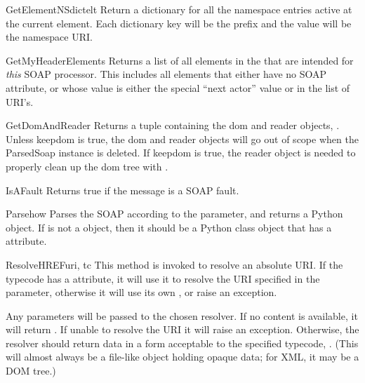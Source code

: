 \begin{methoddesc}{GetElementNSdict}{elt}
Return a dictionary for all the namespace entries active at the
current element. Each dictionary key will be the prefix and the value will
be the namespace URI.
\end{methoddesc}

\begin{methoddesc}{GetMyHeaderElements}{}
Returns a list of all elements in the  that are intended for
\emph{this} SOAP processor.
This includes all elements that either have no SOAP 
attribute, or whose value is either the special ``next actor'' value or
in the  list of URI's.
\end{methoddesc}

\begin{methoddesc}{GetDomAndReader}{}
Returns a tuple containing the dom and reader objects, .
Unless keepdom is true, the dom and reader objects will go out of scope
when the ParsedSoap instance is deleted. If keepdom is true, the reader
object is needed to properly clean up the dom tree with
.
\end{methoddesc}

\begin{methoddesc}{IsAFault}{}
Returns true if the message is a SOAP fault.
\end{methoddesc}

\begin{methoddesc}{Parse}{how}
Parses the SOAP  according to the  parameter,
and returns a Python object.
If  is not a  object, then it should be a
Python class object that has a  attribute.
\end{methoddesc}

\begin{methoddesc}{ResolveHREF}{uri, tc}
This method is invoked to resolve an absolute URI.
If the typecode  has a  attribute, it will use it
to resolve the URI specified in the  parameter,
otherwise it will use its own , or raise an
 exception.

Any  parameters will be passed to the chosen resolver.
If no content is available, it will return .
If unable to resolve the URI it will raise an
 exception.
Otherwise, the resolver should return data in a form acceptable to the
specified typecode, .
(This will almost always be a file-like object holding opaque data;
for XML, it may be a DOM tree.)
\end{methoddesc}

